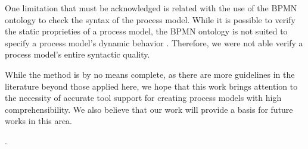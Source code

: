 \documentclass[a4paper,twoside]{article}
\begin{document}
One limitation that must be acknowledged is related with the use of the BPMN ontology to check the syntax of the process model. While it is possible to verify the static proprieties of a process model, the BPMN ontology is not suited to specify  a process model's dynamic behavior \cite{Rospocher2014foisbpmn}. Therefore, we were not able verify a process model's entire syntactic quality.

While the method is by no means complete, as there are more guidelines in the literature beyond those applied here, we hope that this work brings attention to the necessity of accurate tool support for creating process models with high comprehensibility. We also believe that our work will provide a basis for future works in this area.

.

%


\end{document}
